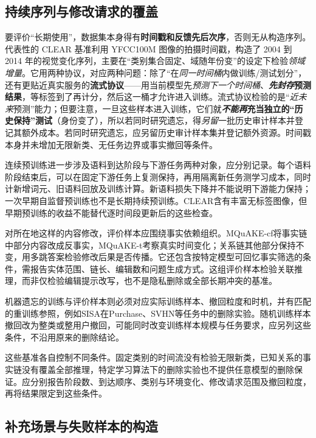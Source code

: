 \subsection{持续序列与修改请求的覆盖}
\label{sec:ket-evolution-evaluation-coverage}

要评价“长期使用”，数据集本身得有\textbf{时间戳和反馈先后次序}，否则无从构造序列。代表性的 CLEAR 基准利用 YFCC100M 图像的拍摄时间戳，构造了 2004 到 2014 年的视觉变化序列，主要在“类别集合固定、域随年份变”的设定下检验\emph{领域增量}。它用两种协议，对应两种问题：除了“在\emph{同一时间桶}内做训练/测试划分”，还有更贴近真实服务的\textbf{流式协议}——用当前模型先\emph{预测下一个时间桶}、\textbf{\emph{先封存}预测结果}，等标签到了再计分，然后这一桶才允许进入训练。流式协议检验的是“\emph{近未来}预测”能力；但要注意，一旦这些样本进入训练，它们就\textbf{\emph{不能再}充当独立的“历史保持”测试}（身份变了），所以若同时研究遗忘，得\emph{另留}一批历史审计样本并登记其额外成本。若同时研究遗忘，应另留历史审计样本集并登记额外资源。时间戳本身并未增加无限新类、无任务边界或事实撤回等条件。

连续预训练进一步涉及语料到达阶段与下游任务两种对象，应分别记录。每个语料阶段结束后，可以在固定下游任务上复测保持，再用隔离新任务测学习成本，同时计新增词元、旧语料回放及训练计算。新语料损失下降并不能说明下游能力保持；一次早期自监督预训练也不是长期持续预训练。CLEAR含有丰富无标签图像，但早期预训练的收益不能替代逐时间段更新后的这些检查。

对所在地这样的内容修改，评价样本应围绕事实依赖组织。MQuAKE-cf将事实链中部分内容改成反事实，MQuAKE-t考察真实时间变化；关系链其他部分保持不变，用多跳答案检验修改后果是否传播。它还包含按特定模型可回忆事实筛选的条件，需报告实体范围、链长、编辑数和问题生成方式。这组评价样本检验关联推理，而非仅检验编辑提示改写，也不是隐私删除或全部长期冲突的基准。

机器遗忘的训练与评价样本则必须对应实际训练样本、撤回粒度和时机，并有匹配的重训练参照，例如SISA在Purchase、SVHN等任务中的删除实验。随机训练样本撤回改为整类或整用户撤回，可能同时改变训练样本规模与任务要求，应另列这些条件，不沿用原来的删除结论。

这些基准各自控制不同条件。固定类别的时间流没有检验无限新类，已知关系的事实链没有覆盖全部推理，特定学习算法下的删除实验也不提供任意模型的删除保证。应分别报告阶段数、到达顺序、类别与环境变化、修改请求范围及撤回粒度，再将结果限定到这些条件。

\subsection{补充场景与失败样本的构造}
\label{sec:ket-evolution-evaluation-stress}

